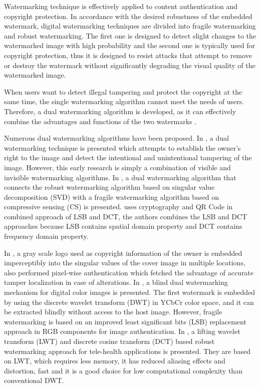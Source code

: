 \documentclass[runningheads]{llncs}
\begin{document}
Watermarking technique is effectively applied to content authentication and copyright protection. In accordance with the desired robustness of the embedded watermark, digital watermarking techniques are divided into fragile watermarking and robust watermarking. The first one is designed to detect slight changes to the watermarked image with high probability and the second one is typically used for copyright protection, thus it is designed to resist attacks that attempt to remove or destroy the watermark without significantly degrading the visual quality of the watermarked image.

When users want to detect illegal tampering and protect the copyright at the same time, the single watermarking algorithm cannot meet the needs of users. Therefore, a dual watermarking algorithm is developed, as it can effectively combine the advantages and functions of the two watermarks \cite{wang2017dual}.

Numerous dual watermarking algorithms have been proposed. In \cite{mohanty1999dual}, a dual watermarking technique is presented which attempts to establish the owner’s right to the image and detect the intentional and unintentional tampering of the image. However, this early research is simply a combination of visible and invisible watermarking algorithms. In \cite{wang2017dual},  a dual watermarking algorithm that connects the robust watermarking algorithm based on singular value decomposition (SVD) with a fragile watermarking algorithm based on compressive sensing (CS) is presented. \cite{singh2018hybrid} uses cryptography and QR Code in combined approach of LSB and DCT, the authors combines the LSB and DCT approaches because LSB contains spatial domain property and DCT contains frequency domain property.

In \cite{shivani2017dual}, a gray scale logo used as copyright information of the owner is embedded imperceptibly into the singular values of the cover image in multiple locations, also performed pixel-wise authentication which fetched the advantage of accurate tamper localization in case of alterations. In \cite{liu2018blind}, a blind dual watermarking mechanism for digital color images is presented. The first watermark is embedded by using the discrete wavelet transform (DWT) in YCbCr color space, and it can be extracted blindly without access to the host image. However, fragile watermarking is based on an improved least significant bits (LSB) replacement approach in RGB components for image authentication. In \cite{singh2019robust}, a lifting wavelet transform (LWT) and discrete cosine transform (DCT) based robust watermarking approach for tele-health applications is presented. They are based on LWT, which requires less memory, it has reduced aliasing effects and distortion, fast and it is a good choice for low computational complexity than conventional DWT.
\end{document}

